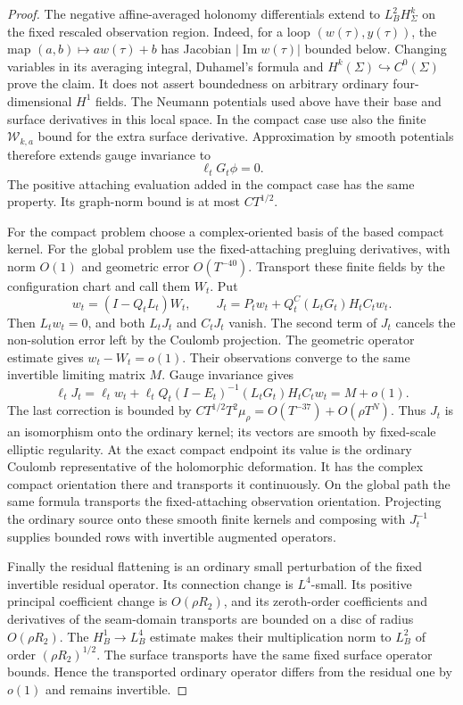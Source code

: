 \documentclass[11pt]{amsart}
\theoremstyle{definition}
\theoremstyle{remark}
\theoremstyle{plain}
\begin{document}
\begin{proof}
The negative affine-averaged holonomy differentials extend
to $L^2_BH^k_\Sigma$ on the fixed rescaled observation region.
Indeed, for a loop $(w(\tau),y(\tau))$, the map
$(a,b)\mapsto aw(\tau)+b$ has Jacobian
$|\operatorname{Im}w(\tau)|$ bounded below.
Changing variables in its averaging integral, Duhamel's
formula and $H^k(\Sigma)\hookrightarrow C^0(\Sigma)$ prove
the claim. It does not assert boundedness on arbitrary
ordinary four-dimensional $H^1$ fields.
The Neumann potentials used above have their base and surface
derivatives in this local space. In the compact case use
also the finite $\mathcal W_{k,a}$ bound for the extra surface
derivative. Approximation by smooth potentials therefore
extends gauge invariance to
\[
                             \ell_tG_t\phi=0.
\]
The positive attaching evaluation added in the compact case
has the same property. Its graph-norm bound is at most
$CT^{1/2}$.

For the compact problem choose a complex-oriented basis of
the based compact kernel. For the global problem use the
fixed-attaching pregluing derivatives, with norm $O(1)$ and
geometric error $O(T^{-40})$. Transport these finite fields
by the configuration chart and call them $W_t$. Put
\begin{equation}\label{eq:excision-annular-kernel-frame}
 w_t=(I-Q_tL_t)W_t,\qquad
 J_t=P_tw_t+Q_t^C(L_tG_t)H_tC_tw_t.
\end{equation}
Then $L_tw_t=0$, and both $L_tJ_t$ and $C_tJ_t$ vanish.
The second term of $J_t$ cancels the non-solution error
left by the Coulomb projection.
The geometric operator estimate gives $w_t-W_t=o(1)$.
Their observations converge to the same invertible limiting
matrix $M$. Gauge invariance gives
\begin{equation}\label{eq:excision-annular-kernel-observations}
 \ell_tJ_t
 =\ell_tw_t+
       \ell_tQ_t(I-E_t)^{-1}(L_tG_t)H_tC_tw_t=M+o(1).
\end{equation}
The last correction is bounded by
$CT^{1/2}T^2\mu_\rho=O(T^{-37})+O(\rho T^N)$.
Thus $J_t$ is an isomorphism onto the ordinary kernel;
its vectors are smooth by fixed-scale elliptic regularity.
At the exact compact endpoint its value is the ordinary
Coulomb representative of the holomorphic deformation.
It has the complex compact orientation there and transports
it continuously. On the global path the same formula
transports the fixed-attaching observation orientation.
Projecting the ordinary source onto these smooth finite kernels
and composing with $J_t^{-1}$ supplies bounded rows with
invertible augmented operators.

Finally the residual flattening is an ordinary small
perturbation of the fixed invertible residual operator.
Its connection change is $L^4$-small. Its positive principal
coefficient change is $O(\rho R_2)$, and its zeroth-order
coefficients and derivatives of the seam-domain transports
are bounded on a disc of radius $O(\rho R_2)$.
The $H^1_B\to L^4_B$ estimate makes their multiplication
norm to $L^2_B$ of order $(\rho R_2)^{1/2}$.
The surface transports have the same fixed surface operator
bounds. Hence the transported ordinary operator differs
from the residual one by $o(1)$ and remains invertible.
\end{proof}
\end{document}
